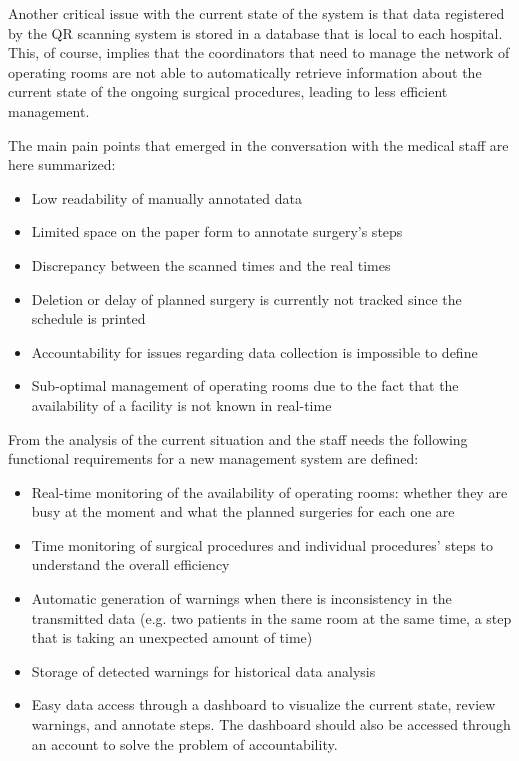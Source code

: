 Another critical issue with the current state of the system is that data registered by the QR scanning system is stored in a database that is local to each hospital. This, of course, implies that the coordinators that need to manage the network of operating rooms are not able to automatically retrieve information about the current state of the ongoing surgical procedures, leading to less efficient management.

The main pain points that emerged in the conversation with the medical staff are here summarized:
\begin{itemize}
    \item Low readability of manually annotated data
    \item Limited space on the paper form to annotate surgery's steps
    \item Discrepancy between the scanned times and the real times
    \item Deletion or delay of planned surgery is currently not tracked since the schedule is printed
    \item Accountability for issues regarding data collection is impossible to define
    \item Sub-optimal management of operating rooms due to the fact that the availability of a facility is not known in real-time
\end{itemize}

From the analysis of the current situation and the staff needs the following functional requirements for a new management system are defined:
\begin{itemize}
    \item Real-time monitoring of the availability of operating rooms: whether they are busy at the moment and what the planned surgeries for each one are
    \item Time monitoring of surgical procedures and individual procedures' steps to understand the overall efficiency
    \item Automatic generation of warnings when there is inconsistency in the transmitted data (e.g. two patients in the same room at the same time, a step that is taking an unexpected amount of time)
    \item Storage of detected warnings for historical data analysis
    \item Easy data access through a dashboard to visualize the current state, review warnings, and annotate steps. The dashboard should also be accessed through an account to solve the problem of accountability.
\end{itemize}

